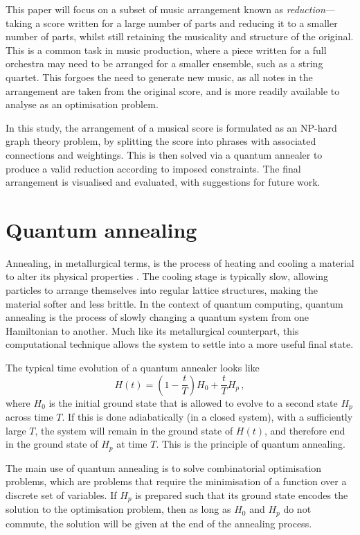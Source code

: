 \documentclass[12pt]{article}
\begin{document}
This paper will focus on a subset of music arrangement known as \textit{reduction}—taking a score written for a large number of parts and reducing it to a smaller number of parts, whilst still retaining the musicality and structure of the original. This is a common task in music production, where a piece written for a full orchestra may need to be arranged for a smaller ensemble, such as a string quartet. This forgoes the need to generate new music, as all notes in the arrangement are taken from the original score, and is more readily available to analyse as an optimisation problem.

In this study, the arrangement of a musical score is formulated as an NP-hard graph theory problem, by splitting the score into phrases with associated connections and weightings. This is then solved via a quantum annealer to produce a valid reduction according to imposed constraints. The final arrangement is visualised and evaluated, with suggestions for future work.

\section{Quantum annealing}

Annealing, in metallurgical terms, is the process of heating and cooling a material to alter its physical properties . The cooling stage is typically slow, allowing particles to arrange themselves into regular lattice structures, making the material softer and less brittle. In the context of quantum computing, quantum annealing is the process of slowly changing a quantum system from one Hamiltonian to another. Much like its metallurgical counterpart, this computational technique allows the system to settle into a more useful final state.

The typical time evolution of a quantum annealer looks like
\begin{equation}
    H(t)=\left(1- \frac{t}{T}\right)H_0 + \frac{t}{T}H_p \,,
    \label{eq:time-evolution}
\end{equation}
where $H_0$ is the initial ground state that is allowed to evolve to a second state $H_p$ across time $T$. If this is done adiabatically (in a closed system), with a sufficiently large $T$, the system will remain in the ground state of $H(t)$, and therefore end in the ground state of $H_p$ at time $T$. This is the principle of quantum annealing.

The main use of quantum annealing is to solve combinatorial optimisation problems, which are problems that require the minimisation of a function over a discrete set of variables. If $H_p$ is prepared such that its ground state encodes the solution to the optimisation problem, then as long as $H_0$ and $H_p$ do not commute, the solution will be given at the end of the annealing process.
\end{document}
